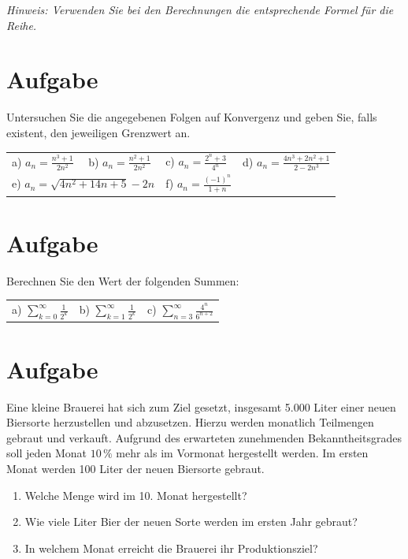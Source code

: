 \documentclass[fontsize=11pt, parskip=half]{scrartcl}
\begin{document}
\emph{Hinweis: Verwenden Sie bei den Berechnungen die entsprechende
Formel für die Reihe.}

\section{Aufgabe}
Untersuchen Sie die angegebenen Folgen auf Konvergenz und
geben Sie, falls existent, den jeweiligen Grenzwert an.\\

\begin{tabular}{llll}
a) $\displaystyle{a_n = \frac{n^3 +1}{2n^2}}$ & b) $\displaystyle{a_n = \frac{n^2 +1}{2n^2}}$ & c) $\displaystyle{a_n = \frac{2^n +3}{4^n}}$ & d) $a_n = \frac{4n^3+2n^2+1}{2 - 2n^3} $
\\[0.5cm]
\multicolumn{2}{l}{e) $\displaystyle{a_n = \sqrt{4n^2+14n+5} -2n}$}
& f) $\displaystyle{a_n = \frac{(-1)^n}{1+n}}$

\end{tabular}

\section{Aufgabe}
Berechnen Sie den Wert der folgenden Summen:\\

\begin{tabular}{lll}
a) $\displaystyle{ \sum_{k=0}^{\infty}\frac{1}{2^{k}}}$ & b)
$\displaystyle{ \sum_{k=1}^{\infty}\frac{1}{2^{k}}}$ & c)
$\displaystyle{ \sum_{n=3}^{\infty}\frac{4^n}{6^{n+2}}}$
\end{tabular}

\section{Aufgabe}
Eine kleine Brauerei hat sich zum Ziel gesetzt,
insgesamt 5.000 Liter einer neuen Biersorte herzustellen und
abzusetzen. Hierzu werden monatlich Teilmengen gebraut und verkauft.
Aufgrund des erwarteten zunehmenden Bekanntheitsgrades soll jeden
Monat $10 \,\%$ mehr als im Vormonat hergestellt werden. Im ersten
Monat werden 100 Liter der neuen Biersorte gebraut.

\begin{enumerate}[label=\alph*)]
 \item Welche Menge wird im 10. Monat hergestellt?
 \item Wie viele Liter Bier der neuen Sorte werden im ersten Jahr gebraut?
 \item In welchem Monat erreicht die Brauerei ihr Produktionsziel?
 \end{enumerate}
\end{document}
